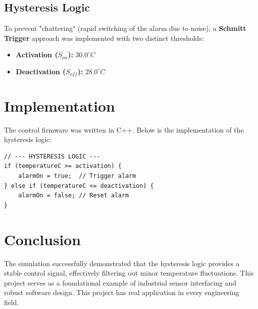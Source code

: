 \documentclass[11pt,a4paper]{article}
\begin{document}
\subsection{Hysteresis Logic}
To prevent "chattering" (rapid switching of the alarm due to noise), a \textbf{Schmitt Trigger} approach was implemented with two distinct thresholds:
\begin{itemize}
    \item \textbf{Activation ($S_{on}$):} $30.0^\circ C$
    \item \textbf{Deactivation ($S_{off}$):} $28.0^\circ C$
\end{itemize}

\section{Implementation}
The control firmware was written in C++. Below is the implementation of the hysteresis logic:

\begin{lstlisting}
// --- HYSTERESIS LOGIC ---
if (temperatureC >= activation) {
    alarmOn = true;  // Trigger alarm
} else if (temperatureC <= deactivation) {
    alarmOn = false; // Reset alarm
}
\end{lstlisting}

\section{Conclusion}
The simulation successfully demonstrated that the hysteresis logic provides a stable control signal, effectively filtering out minor temperature fluctuations. This project serves as a foundational example of industrial sensor interfacing and robust software design.
This project has real application in every engineering field.
\end{document}
